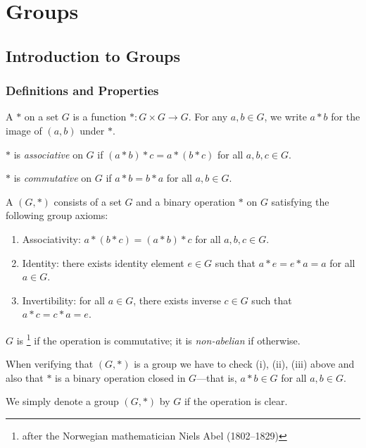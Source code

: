 \chapter{Groups}\label{chap:groups}
\section{Introduction to Groups}
\subsection{Definitions and Properties}
\begin{definition}
A  $\ast$ on a set $G$ is a function $\ast:G\times G\to G$. For any $a,b\in G$, we write $a \ast b$ for the image of $(a,b)$ under $\ast$.

$\ast$ is \emph{associative} on $G$ if $(a\ast b)\ast c=a\ast(b\ast c)$ for all $a,b,c\in G$.

$\ast$ is \emph{commutative} on $G$ if $a\ast b=b\ast a$ for all $a,b\in G$.
\end{definition}

\begin{definition}[Group]
A  $(G,\ast)$ consists of a set $G$ and a binary operation $\ast$ on $G$ satisfying the following group axioms:
\begin{enumerate}[label=(\roman*)]
\item Associativity: $a\ast(b\ast c)=(a\ast b)\ast c$ for all $a,b,c\in G$.
\item Identity: there exists identity element $e\in G$ such that $a\ast e=e\ast a=a$ for all $a\in G$.
\item Invertibility: for all $a\in G$, there exists inverse $c\in G$ such that $a\ast c=c\ast a=e$.
\end{enumerate}

$G$ is \footnote{after the Norwegian mathematician Niels 
Abel (1802--1829)} if the operation is commutative; it is \emph{non-abelian} if otherwise.
\end{definition}

\begin{remark}
When verifying that $(G,\ast)$ is a group we have to check (i), (ii), (iii) above and also that $\ast$ is a binary operation closed in $G$---that is, $a\ast b\in G$ for all $a,b\in G$.
\end{remark}

\begin{notation}
We simply denote a group $(G,\ast)$ by $G$ if the operation is clear.
\end{notation}

